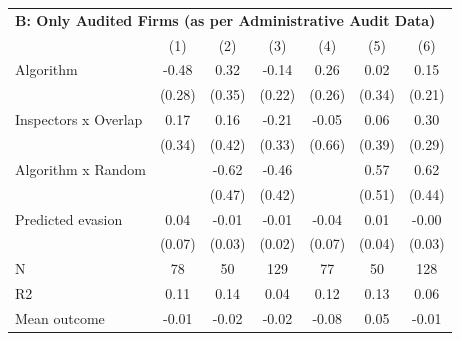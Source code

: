\begin{tabular}{lccc|ccc}
\midrule \multicolumn{7}{l}{\textbf{B: Only Audited Firms (as per Administrative Audit Data)}} \\ \multicolumn{1}{l}{} & (1) & (2) & (3) & (4) & (5) & (6) \\ \midrule

Algorithm   &       -0.48\sym{*}  &        0.32         &       -0.14         &        0.26         &        0.02         &        0.15         \\
            &      (0.28)         &      (0.35)         &      (0.22)         &      (0.26)         &      (0.34)         &      (0.21)         \\
\addlinespace
Inspectors x Overlap&        0.17         &        0.16         &       -0.21         &       -0.05         &        0.06         &        0.30         \\
            &      (0.34)         &      (0.42)         &      (0.33)         &      (0.66)         &      (0.39)         &      (0.29)         \\
\addlinespace
Algorithm x Random&                     &       -0.62         &       -0.46         &                     &        0.57         &        0.62         \\
            &                     &      (0.47)         &      (0.42)         &                     &      (0.51)         &      (0.44)         \\
\addlinespace
Predicted evasion&        0.04         &       -0.01         &       -0.01         &       -0.04         &        0.01         &       -0.00         \\
            &      (0.07)         &      (0.03)         &      (0.02)         &      (0.07)         &      (0.04)         &      (0.03)         \\
\midrule
N           &          78         &          50         &         129         &          77         &          50         &         128         \\
R2          &        0.11         &        0.14         &        0.04         &        0.12         &        0.13         &        0.06         \\
Mean outcome&       -0.01         &       -0.02         &       -0.02         &       -0.08         &        0.05         &       -0.01         \\
\bottomrule \end{tabular}

